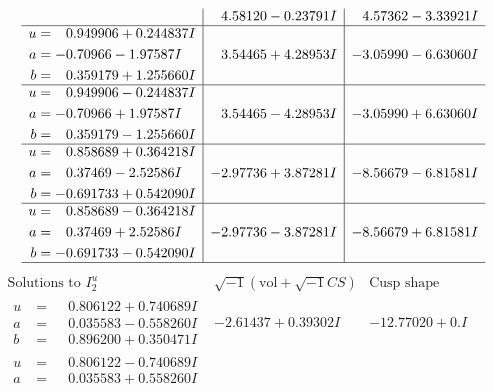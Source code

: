 \documentclass[1p]{elsarticle_modified}
\theoremstyle{definition}
\newcommand{\I}{\sqrt{-1}}
\begin{document}
$$\begin{array}{c|c|c}
 & \phantom{-}4.58120 - 0.23791 I & \phantom{-}4.57362 - 3.33921 I \\ \hline\begin{aligned}
u &= \phantom{-}0.949906 + 0.244837 I \\
a &= -0.70966 - 1.97587 I \\
b &= \phantom{-}0.359179 + 1.255660 I\end{aligned}
 & \phantom{-}3.54465 + 4.28953 I & -3.05990 - 6.63060 I \\ \hline\begin{aligned}
u &= \phantom{-}0.949906 - 0.244837 I \\
a &= -0.70966 + 1.97587 I \\
b &= \phantom{-}0.359179 - 1.255660 I\end{aligned}
 & \phantom{-}3.54465 - 4.28953 I & -3.05990 + 6.63060 I \\ \hline\begin{aligned}
u &= \phantom{-}0.858689 + 0.364218 I \\
a &= \phantom{-}0.37469 - 2.52586 I \\
b &= -0.691733 + 0.542090 I\end{aligned}
 & -2.97736 + 3.87281 I & -8.56679 - 6.81581 I \\ \hline\begin{aligned}
u &= \phantom{-}0.858689 - 0.364218 I \\
a &= \phantom{-}0.37469 + 2.52586 I \\
b &= -0.691733 - 0.542090 I\end{aligned}
 & -2.97736 - 3.87281 I & -8.56679 + 6.81581 I\\
 \hline 
 \end{array}$$\newpage$$\begin{array}{c|c|c}  
\text{Solutions to }I^u_{2}& \I (\text{vol} + \sqrt{-1}CS) & \text{Cusp shape}\\
 \hline 
\begin{aligned}
u &= \phantom{-}0.806122 + 0.740689 I \\
a &= \phantom{-}0.035583 - 0.558260 I \\
b &= \phantom{-}0.896200 + 0.350471 I\end{aligned}
 & -2.61437 + 0.39302 I & -12.77020 + 0. I\phantom{ +0.000000I} \\ \hline\begin{aligned}
u &= \phantom{-}0.806122 - 0.740689 I \\
a &= \phantom{-}0.035583 + 0.558260 I \\

\end{aligned}
\end{array}$$
\end{document}

